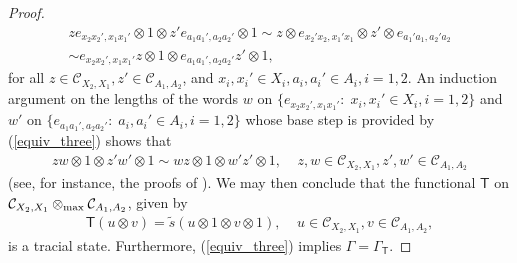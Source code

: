 \documentclass[11pt]{amsart}
\newcommand{\cl}[1]{\mathcal{#1}}
\begin{document}
\begin{proof}
\begin{gather}\label{equiv_three}
	ze_{x_{2}x_{2}', x_{1}x_{1}'}\otimes 1 \otimes z'e_{a_{1}a_{1}', a_{2}a_{2}'}\otimes 1 \sim z \otimes e_{x_{2}'x_{2}, x_{1}'x_{1}}\otimes z' \otimes e_{a_{1}'a_{1}, a_{2}'a_{2}} 
\\\sim e_{x_{2}x_{2}', x_{1}x_{1}'}z\otimes 1\otimes e_{a_{1}a_{1}', a_{2}a_{2}'}z'\otimes 1,
\end{gather}
\noindent for all $z \in \cl{C}_{X_{2}, X_{1}}, z' \in \cl{C}_{A_{1}, A_{2}}$, and $x_{i}, x_{i}' \in X_{i}, a_{i}, a_{i}' \in A_{i}, i = 1, 2$. An induction argument on the lengths of the words $w$ on $\{e_{x_{2}x_{2}', x_{1}x_{1}'}: \; x_{i}, x_{i}' \in X_{i}, i = 1, 2\}$ and $w'$ on $\{e_{a_{1}a_{1}', a_{2}a_{2}'}: \; a_{i}, a_{i}' \in A_{i}, i = 1, 2\}$ whose base step is provided by (\ref{equiv_three}) shows that
\begin{gather*}
	zw\otimes 1 \otimes z'w'\otimes 1 \sim wz\otimes 1 \otimes w'z'\otimes 1, \;\;\;\; z, w \in \cl{C}_{X_{2}, X_{1}}, z', w' \in \cl{C}_{A_{1}, A_{2}}
\end{gather*}
\noindent (see, for instance, the proofs of \cite[Theorem 3.2, Theorem 4.1]{synch_bhtt}). We may then conclude that the functional $\mathsf{T}$ on $\cl{C}_{X_{2}, X_{1}}\otimes_{\rm max} \cl{C}_{A_{1}, A_{2}}$, given by
\begin{gather*}
	\mathsf{T}(u\otimes v) = \tilde{s}(u\otimes 1 \otimes v\otimes 1), \;\;\;\; u \in \cl{C}_{X_{2}, X_{1}}, v \in \cl{C}_{A_{1}, A_{2}},
\end{gather*}
\noindent is a tracial state. Furthermore, (\ref{equiv_three}) implies $\Gamma = \Gamma_{\mathsf{T}}$. 


\end{proof}
\end{document}
